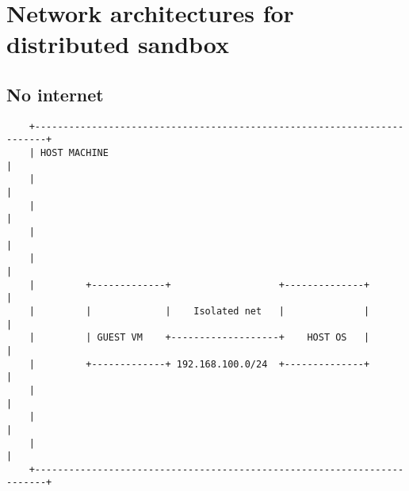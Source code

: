 \chapter{Network architectures for distributed sandbox} \label{app:network}
\section{No internet}
\begin{verbatim}
    +------------------------------------------------------------------------+
    | HOST MACHINE                                                           |
    |                                                                        |
    |                                                                        |
    |                                                                        |
    |                                                                        |
    |         +-------------+                   +--------------+             |
    |         |             |    Isolated net   |              |             |
    |         | GUEST VM    +-------------------+    HOST OS   |             |
    |         +-------------+ 192.168.100.0/24  +--------------+             |
    |                                                                        |
    |                                                                        |
    |                                                                        |
    +------------------------------------------------------------------------+
\end{verbatim}

\newpage

